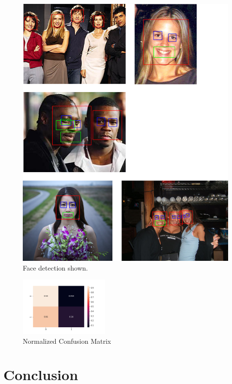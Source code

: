\documentclass[11pt, a4paper, twocolumn]{article}
\begin{document}
\begin{figure}[h]
 \includegraphics[width=1\columnwidth]{images/04_withFaceRectangle.png}
 \centering
 \caption{Face detection shown.}
 \label{fig:04_withFaces}
\end{figure}

%
\begin{figure}[h]
    \centering
    \includegraphics[width=0.4\textwidth]{images/confusion_matrix.png}
    \caption{Normalized Confusion Matrix}
    \label{fig:conf_matrix}
\end{figure}

\section*{Conclusion}



{}

%
\end{document}
